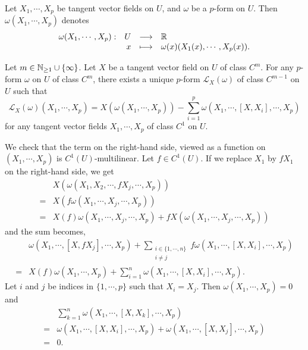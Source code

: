 \begin{definitionenv}
    Let $X_1,\cdots,X_p$ be tangent vector fields on $U$, and $\omega$ be a $p$-form on $U$.
    Then $\omega(X_1,\cdots,X_p)$ denotes
    $$\begin{array}{rrcl}
        \omega(X_1,\cdots,X_p) : & U & \longrightarrow & \mathbb{R}\\
        & x & \longmapsto & \omega(x)(X_1(x),\cdots,X_p(x)).
    \end{array}$$
\end{definitionenv}

\begin{propositionenv}
    Let $m \in \mathbb{N}_{\ge 1} \cup \{\infty\}$.
    Let $X$ be a tangent vector field on $U$ of class $C^m$.
    For any $p$-form $\omega$ on $U$ of class $C^m$, there exists a unique $p$-form $\mathcal{L}_{X}(\omega)$ of class $C^{m-1}$ on $U$ such that
    $$\mathcal{L}_{X}(\omega)(X_1,\cdots,X_p) = X\left(\omega(X_1,\cdots,X_p)\right) - \sum_{i=1}^{p} \omega(X_1,\cdots,[X,X_i],\cdots,X_p)$$
    for any tangent vector fields $X_1,\cdots,X_p$ of class $C^1$ on $U$.
\end{propositionenv}
\begin{proofenv}
    We check that the term on the right-hand side, viewed as a function on $(X_1,\cdots,X_p)$ is $C^1(U)$-multilinear.
    Let $f \in C^1(U)$.
    If we replace $X_1$ by $f X_1$ on the right-hand side, we get
    $$\begin{aligned}
        & X\left(\omega(X_1,X_2,\cdots,f X_j,\cdots,X_p)\right)\\
        = & X \left(f \omega(X_1,\cdots,X_j,\cdots,X_p)\right)\\
        = & X(f) \omega(X_1,\cdots,X_j,\cdots,X_p) + f X\left(\omega(X_1,\cdots,X_j,\cdots,X_p)\right)
    \end{aligned}$$
    and the sum becomes,
    $$\begin{aligned}
        & \omega(X_1,\cdots,[X,f X_j],\cdots,X_p) + \sum_{\substack{i \in \{1,\cdots,n\}\\i \neq j}} f \omega(X_1,\cdots,[X,X_i],\cdots,X_p)\\
        = & X(f) \omega(X_1,\cdots,X_p) + \sum_{i=1}^{n} \omega(X_1,\cdots,[X,X_i],\cdots,X_p).
    \end{aligned}$$
    Let $i$ and $j$ be indices in $\{1,\cdots,p\}$ such that $X_i = X_j$.
    Then $\omega(X_1,\cdots,X_p) = 0$ and
    $$\begin{aligned}
        & \sum_{k=1}^{n} \omega(X_1,\cdots,[X,X_k],\cdots,X_p)\\
        = & \omega(X_1,\cdots,[X,X_i],\cdots,X_p) + \omega(X_1,\cdots,[X,X_j],\cdots,X_p)\\
        = & 0.
    \end{aligned}$$
\end{proofenv}

